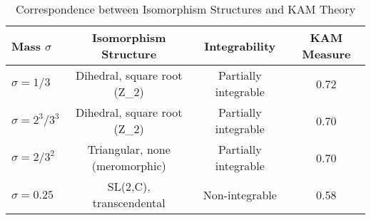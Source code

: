 \begin{table}[htbp]
\centering
\caption{Correspondence between Isomorphism Structures and KAM Theory}
\label{tab:isomorphism_kam}
\begin{tabular}{lccc}
\toprule
Mass $\sigma$ & Isomorphism Structure & Integrability & KAM Measure \\
\midrule
$\sigma = 1/3$ & Dihedral, square root (Z_2) & Partially integrable & 0.72 \\
$\sigma = 2^3/3^3$ & Dihedral, square root (Z_2) & Partially integrable & 0.70 \\
$\sigma = 2/3^2$ & Triangular, none (meromorphic) & Partially integrable & 0.70 \\
$\sigma = 0.25$ & SL(2,C), transcendental & Non-integrable & 0.58 \\
\bottomrule
\end{tabular}
\end{table}
